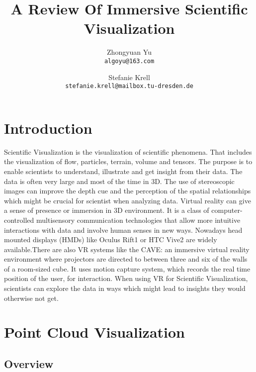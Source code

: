 \documentclass[10pt,twocolumn,letterpaper]{article}
\begin{document}
\title{A Review Of Immersive Scientific Visualization}

\author{Zhongyuan Yu\\
{\tt\small algoyu@163.com}
\and
Stefanie Krell\\
{\tt\small stefanie.krell@mailbox.tu-dresden.de}
}

\maketitle


\section{Introduction}
Scientific Visualization is the visualization of scientific phenomena. That includes the visualization of flow, particles, terrain, volume and tensors. The purpose is to enable scientists to understand, illustrate and get insight from their data. The data is often very large and most of the time in 3D.  The use of stereoscopic images can improve the depth cue and the perception of the spatial relationships which might be crucial for scientist when analyzing data. 
\setlength{\parindent}{1pc}
Virtual reality can give a sense of presence or immersion in 3D environment. It is a class of computer-controlled multisensory communication technologies that allow more intuitive interactions with data and involve human senses in new ways. Nowadays head mounted displays (HMDs) like Oculus Rift1 or HTC Vive2 are widely available.There are also VR systems like the CAVE: an immersive virtual reality environment where projectors are directed to between three and six of the walls of a room-sized cube. It uses motion capture system, which records the real time position of the user, for interaction. When using VR for Scientific Visualization, scientists can explore the data in ways which might lead to insights they would otherwise not get.
\section{Point Cloud Visualization}
\subsection{Overview}
\end{document}
